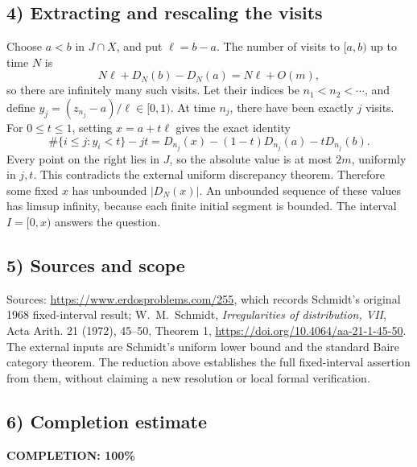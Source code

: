 \subsection{4) Extracting and rescaling the visits}
Choose $a<b$ in $J\cap X$, and put $\ell=b-a$.
The number of visits to $[a,b)$ up to time $N$ is
\[
 N\ell+D_N(b)-D_N(a)=N\ell+O(m),
\]
so there are infinitely many such visits. Let their indices
be $n_1<n_2<\cdots$, and define
$y_j=(z_{n_j}-a)/\ell\in[0,1)$.
At time $n_j$, there have been exactly $j$ visits.
For $0\leq t\leq1$, setting $x=a+t\ell$ gives the exact identity
\[
 \#\{i\leq j:y_i<t\}-jt
   =D_{n_j}(x)-(1-t)D_{n_j}(a)-tD_{n_j}(b).
\]
Every point on the right lies in $J$, so the absolute value
is at most $2m$, uniformly in $j,t$.
This contradicts the external uniform discrepancy theorem.
Therefore some fixed $x$ has unbounded $|D_N(x)|$.
An unbounded sequence of these values has limsup infinity,
because each finite initial segment is bounded. The interval
$I=[0,x)$ answers the question.

\subsection{5) Sources and scope}
Sources: \url{https://www.erdosproblems.com/255}, which records
Schmidt's original 1968 fixed-interval result;
W.~M.~Schmidt, \emph{Irregularities of distribution, VII},
Acta Arith. 21 (1972), 45--50, Theorem 1,
\url{https://doi.org/10.4064/aa-21-1-45-50}.
The external inputs are Schmidt's uniform lower bound and
the standard Baire category theorem. The reduction above
establishes the full fixed-interval assertion from them,
without claiming a new resolution or local formal verification.
\subsection{6) Completion estimate}
\textbf{COMPLETION: 100\%}
